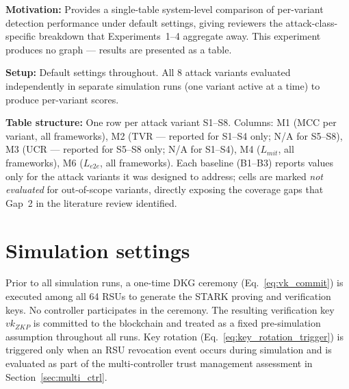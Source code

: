 \documentclass[12pt, a4paper]{report}
\begin{document}
{{\textbf{Motivation:} Provides a single-table
system-level comparison of per-variant detection
performance under default settings, giving
reviewers the attack-class-specific breakdown
that Experiments~1--4 aggregate away. This
experiment produces no graph — results are
presented as a table.

\textbf{Setup:} Default settings throughout.
All 8 attack variants evaluated independently
in separate simulation runs (one variant active
at a time) to produce per-variant scores.

\textbf{Table structure:} One row per attack
variant S1--S8. Columns: M1 (MCC per variant,
all frameworks), M2 (TVR — reported for S1--S4
only; N/A for S5--S8), M3 (UCR — reported for
S5--S8 only; N/A for S1--S4), M4 ($L_{mit}$,
all frameworks), M6 ($L_{e2e}$, all frameworks).
Each baseline (B1--B3) reports values only for
the attack variants it was designed to address;
cells are marked \textit{not evaluated} for
out-of-scope variants, directly exposing the
coverage gaps that Gap~2 in the literature
review identified.





\section{Simulation settings}
\label{sec:simulation}

Prior to all simulation runs, a one-time \ac{DKG}
ceremony (Eq.~\ref{eq:vk_commit}) is executed among
all 64 RSUs to generate the \ac{STARK} proving and
verification keys. No controller participates in the
ceremony. The resulting verification key $vk_{ZKP}$
is committed to the blockchain and treated as a fixed
pre-simulation assumption throughout all runs.
Key rotation (Eq.~\ref{eq:key_rotation_trigger}) is
triggered only when an RSU revocation event occurs
during simulation and is evaluated as part of the
multi-controller trust management assessment in
Section~\ref{sec:multi_ctrl}.

}}
\end{document}

